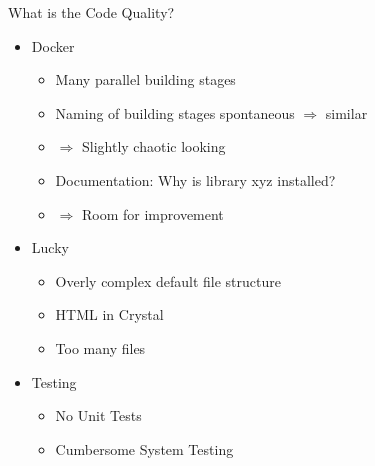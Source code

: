 \documentclass{beamer}
\begin{document}
	\begin{frame}[fragile]{What is the Code Quality?}
		\begin{itemize}[<+->]
			\item Docker
				\begin{itemize}
					\item Many parallel building stages
					\item Naming of building stages spontaneous \(\Rightarrow\) similar
					\item \(\Rightarrow\) Slightly chaotic looking
					\item Documentation: Why is library xyz installed?
					\item \(\Rightarrow\) Room for improvement
				\end{itemize}
			\item Lucky
				\begin{itemize}
					\item Overly complex default file structure
					\item HTML in Crystal
					\item Too many files
				\end{itemize}
			\item Testing
				\begin{itemize}
					\item No Unit Tests
					\item Cumbersome System Testing
				\end{itemize}
		\end{itemize}
	\end{frame}
\end{document}
